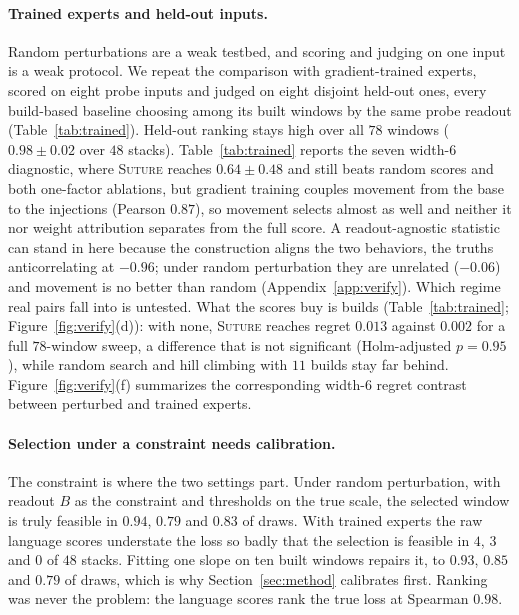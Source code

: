 \documentclass{article}
\theoremstyle{plain}
\theoremstyle{definition}
\theoremstyle{remark}
\begin{document}
\paragraph{Trained experts and held-out inputs.}
Random perturbations are a weak testbed, and scoring and judging on one input is
a weak protocol. We repeat the comparison with gradient-trained experts, scored
on eight probe inputs and judged on eight disjoint held-out ones, every
build-based baseline choosing among its built windows by the same probe readout
(Table~\ref{tab:trained}). Held-out ranking stays high
over all $78$ windows ($0.98\pm0.02$ over $48$ stacks). Table~\ref{tab:trained}
reports the seven width-$6$ diagnostic, where \textsc{Suture} reaches
$0.64\pm0.48$ and still beats random scores and both one-factor ablations, but
gradient training
couples movement from the base
to the injections (Pearson $0.87$), so movement selects almost as well and
neither it nor weight attribution separates from the full score. A
readout-agnostic statistic can stand in here because the construction aligns the
two behaviors, the truths anticorrelating at $-0.96$; under random perturbation
they are unrelated ($-0.06$) and movement is no better than random
(Appendix~\ref{app:verify}). Which regime real pairs fall into is untested. What the scores buy is builds
(Table~\ref{tab:trained}; Figure~\ref{fig:verify}(d)): with none, \textsc{Suture} reaches regret $0.013$
against $0.002$ for a full $78$-window sweep, a difference that is not
significant (Holm-adjusted $p=0.95$), while random search and hill climbing with
$11$ builds stay far behind. Figure~\ref{fig:verify}(f) summarizes the
corresponding width-$6$ regret contrast between perturbed and trained experts.

\paragraph{Selection under a constraint needs calibration.}
The constraint is where the two settings part. Under random perturbation, with
readout $B$ as the constraint and thresholds on the true scale, the selected
window is truly feasible in $0.94$, $0.79$ and $0.83$ of draws. With trained
experts the raw language scores understate the loss so badly that the selection
is feasible in $4$, $3$ and $0$ of $48$ stacks. Fitting one slope on ten built windows repairs it, to $0.93$,
$0.85$ and $0.79$ of draws,
which is why Section~\ref{sec:method} calibrates first. Ranking was never the problem: the
language scores rank the true loss at Spearman $0.98$.
\end{document}
